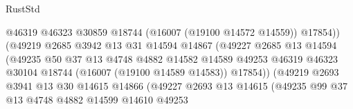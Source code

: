 \begin{lexlean}{RustStd}
\begin{coremodule}
                                          @46319
                                          @46323
                                          @30859
                                          @18744
                                          (@16007 (@19100 @14572 @14559))
                                          @17854))
                                      (@49219
                                        @2685
                                        @3942
                                        @13
                                        @31
                                        @14594
                                        @14867
                                        (@49227
                                          @2685
                                          @13
                                          @14594
                                          (@49235
                                            @50
                                            @37
                                            @13
                                            @4748
                                            @4882
                                            @14582
                                            @14589
                                            @49253
                                            @46319
                                            @46323
                                            @30104
                                            @18744
                                            (@16007 (@19100 @14589 @14583))
                                            @17854))
                                        (@49219
                                          @2693
                                          @3941
                                          @13
                                          @30
                                          @14615
                                          @14866
                                          (@49227
                                            @2693
                                            @13
                                            @14615
                                            (@49235
                                              @99
                                              @37
                                              @13
                                              @4748
                                              @4882
                                              @14599
                                              @14610
                                              @49253

\end{coremodule}
\end{lexlean}
